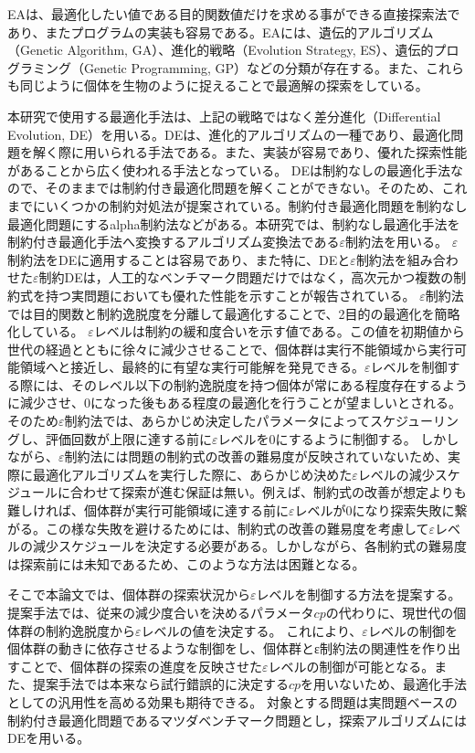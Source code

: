 \documentclass[a4paper,12pt]{jsreport}
\begin{document}
EAは、最適化したい値である目的関数値だけを求める事ができる直接探索法であり、またプログラムの実装も容易である。EAには、遺伝的アルゴリズム（Genetic Algorithm, GA）、進化的戦略（Evolution Strategy, ES）、遺伝的プログラミング（Genetic Programming, GP）などの分類が存在する。また、これらも同じように個体を生物のように捉えることで最適解の探索をしている。

本研究で使用する最適化手法は、上記の戦略ではなく差分進化（Differential Evolution, DE）\cite{DE1}を用いる。DEは、進化的アルゴリズムの一種であり、最適化問題を解く際に用いられる手法である。また、実装が容易であり、優れた探索性能があることから広く使われる手法となっている。
DEは制約なしの最適化手法なので、そのままでは制約付き最適化問題を解くことができない。そのため、これまでにいくつかの制約対処法が提案されている。制約付き最適化問題を制約なし最適化問題にするalpha制約法\cite{α法}などがある。本研究では、制約なし最適化手法を制約付き最適化手法へ変換するアルゴリズム変換法である$\varepsilon$制約法\cite{ε制約法}を用いる。
$\varepsilon$制約法をDEに適用することは容易であり、また特に、DEと$\varepsilon$制約法を組み合わせた$\varepsilon$制約DEは，人工的なベンチマーク問題だけではなく，高次元かつ複数の制約式を持つ実問題においても優れた性能を示すことが報告されている\cite{εDE}。
$\varepsilon$制約法では目的関数と制約逸脱度を分離して最適化することで、2目的の最適化を簡略化している。
$\varepsilon$レベルは制約の緩和度合いを示す値である。この値を初期値から世代の経過とともに徐々に減少させることで、個体群は実行不能領域から実行可能領域へと接近し、最終的に有望な実行可能解を発見できる。$\varepsilon$レベルを制御する際には、そのレベル以下の制約逸脱度を持つ個体が常にある程度存在するように減少させ、0になった後もある程度の最適化を行うことが望ましいとされる\cite{εレベル制御}。
そのため$\varepsilon$制約法では、あらかじめ決定したパラメータによってスケジューリングし、評価回数が上限に達する前に$\varepsilon$レベルを0にするように制御する。
しかしながら、$\varepsilon$制約法には問題の制約式の改善の難易度が反映されていないため、実際に最適化アルゴリズムを実行した際に、あらかじめ決めた$\varepsilon$レベルの減少スケジュールに合わせて探索が進む保証は無い。例えば、制約式の改善が想定よりも難しければ、個体群が実行可能領域に達する前に$\varepsilon$レベルが0になり探索失敗に繋がる。この様な失敗を避けるためには、制約式の改善の難易度を考慮して$\varepsilon$レベルの減少スケジュールを決定する必要がある。しかしながら、各制約式の難易度は探索前には未知であるため、このような方法は困難となる。

そこで本論文では、個体群の探索状況から$\varepsilon$レベルを制御する方法を提案する。提案手法では、従来の減少度合いを決めるパラメータ$cp$の代わりに、現世代の個体群の制約逸脱度から$\varepsilon$レベルの値を決定する。
これにより、$\varepsilon$レベルの制御を個体群の動きに依存させるような制御をし、個体群とε制約法の関連性を作り出すことで、個体群の探索の進度を反映させた$\varepsilon$レベルの制御が可能となる。また、提案手法では本来なら試行錯誤的に決定する$cp$を用いないため、最適化手法としての汎用性を高める効果も期待できる。
対象とする問題は実問題ベースの制約付き最適化問題であるマツダベンチマーク問題とし，探索アルゴリズムにはDEを用いる。
\end{document}
